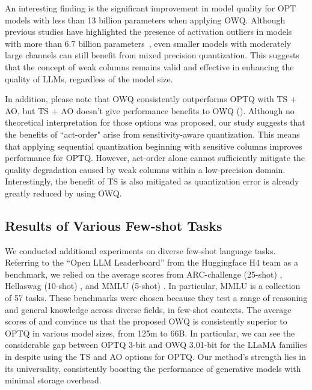 \documentclass[letterpaper]{article} %
\begin{document}
An interesting finding is the significant improvement in model quality for OPT models with less than 13 billion parameters when applying OWQ. Although previous studies have highlighted the presence of activation outliers in models with more than 6.7 billion parameters~\cite{dettmers2022llm}, even smaller models with moderately large channels can still benefit from mixed precision quantization. This suggests that the concept of weak columns remains valid and effective in enhancing the quality of LLMs, regardless of the model size.

In addition, please note that OWQ consistently outperforms OPTQ with TS + AO, but TS + AO doesn't give performance benefits to OWQ ().
Although no theoretical interpretation for those options was proposed, our study suggests that the benefits of ``act-order" arise from sensitivity-aware quantization. This means that applying sequential quantization beginning with sensitive columns improves performance for OPTQ. However, act-order alone cannot sufficiently mitigate the quality degradation caused by weak columns within a low-precision domain. Interestingly, the benefit of TS is also mitigated as quantization error is already greatly reduced by using OWQ. 


\subsection{Results of Various Few-shot Tasks}
We conducted additional experiments on diverse few-shot language tasks. Referring to the “Open LLM Leaderboard” \cite{open-llm-leaderboard} from the Huggingface H4 team as a benchmark, we relied on the average scores from ARC-challenge (25-shot) \cite{clark2018think}, Hellaswag (10-shot) \cite{zellers2019hellaswag}, and MMLU (5-shot) \cite{hendrycks2021measuring}. In particular, MMLU is a collection of 57 tasks. These benchmarks were chosen because they test a range of reasoning and general knowledge across diverse fields, in few-shot contexts.
The average scores of  and  convince us that the proposed OWQ is consistently superior to OPTQ in various model sizes, from 125m to 66B. In particular, we can see the considerable gap between OPTQ 3-bit and OWQ 3.01-bit for the LLaMA families in  despite using the TS and AO options for OPTQ. Our method's strength lies in its universality, consistently boosting the performance of generative models with minimal storage overhead.
\end{document}
